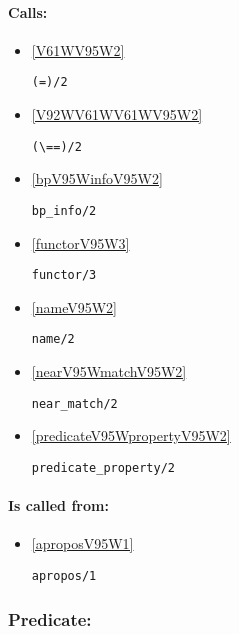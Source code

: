 \paragraph{Calls:} 
\begin{itemize}
\item \ref{V61WV95W2} 
\begin{verbatim}
(=)/2
\end{verbatim}

\item \ref{V92WV61WV61WV95W2} 
\begin{verbatim}
(\==)/2
\end{verbatim}

\item \ref{bpV95WinfoV95W2} 
\begin{verbatim}
bp_info/2
\end{verbatim}

\item \ref{functorV95W3} 
\begin{verbatim}
functor/3
\end{verbatim}

\item \ref{nameV95W2} 
\begin{verbatim}
name/2
\end{verbatim}

\item \ref{nearV95WmatchV95W2} 
\begin{verbatim}
near_match/2
\end{verbatim}

\item \ref{predicateV95WpropertyV95W2} 
\begin{verbatim}
predicate_property/2
\end{verbatim}

\end{itemize}
\paragraph{Is called from:} 
\begin{itemize}
\item \ref{aproposV95W1} 
\begin{verbatim}
apropos/1
\end{verbatim}

\end{itemize}

\subsubsection{Predicate:} \label{argV95W3}


